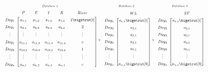 \[
  \setlength{\arraycolsep}{0pt}%
  \renewcommand{\arraystretch}{1.5}%
  \resizebox{.7\textwidth}{!}{
  $
  \begin{array}{ *{8}{c} }
    \scriptstyle Database \: 1 & & %
    \scriptstyle Database \: 2 & & %
    \scriptstyle Database \: 3 & & & %
     \\
    \begin{blockarray}{ccccccc}
    & P & E & T & R & River \\
    \begin{block}{c[cccccc]}
    Day_1 & a_{1,1}&a_{1,2}&a_{1,3}&a_{1,4}&1\bigstrut[t] \\
    Day_1 & a_{2,1}&a_{2,2}&a_{2,3}&a_{2,4}&2 \\
    \vdots & \vdots & \vdots & \vdots & \vdots & \vdots\\
    Day_1 & a_{11,1}&a_{11,2}&a_{11,3}&a_{11,4}&c \\
    Day_2 & a_{12,1}&a_{12,2}&a_{12,3}&a_{12,4}&1 \\
    \vdots & \vdots & \vdots & \vdots & \vdots & \vdots\\
    Day_n & a_{n,1}&a_{n,2}&a_{n,3}&a_{n,4}&c \\
    \end{block}
    \end{blockarray}\vspace*{-1.25\baselineskip}
    & {} + {} &
    \begin{blockarray}{cccccc}
    & WL \\
    \begin{block}{c[ccccc]}
    Day_1 & a_{1,1}\bigstrut[t] \\
    Day_2 & a_{2,1} \\
    Day_3 & a_{3,1} \\
    Day_4 & a_{4,1} \\
    Day_5 & a_{5,1} \\
    \vdots & \vdots \\
    Day_n & a_{n,1}\bigstrut[b]\\
    \end{block}
    \end{blockarray}\vspace*{-1.25\baselineskip}
    & {} + {} &
    \begin{blockarray}{cccccc}
    & SF \\
    \begin{block}{c[ccccc]}
    Day_1 & a_{1,1}\bigstrut[t] \\
    Day_2 & a_{2,1} \\
    Day_3 & a_{3,1} \\
    Day_4 & a_{4,1} \\
    Day_5 & a_{5,1} \\
    \vdots & \vdots \\
    Day_n & a_{n,1}\bigstrut[b]\\
    \end{block}
    \end{blockarray}\vspace*{-1.25\baselineskip}
  \end{array}
  $
  }
\]